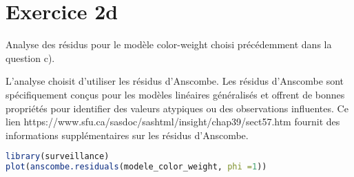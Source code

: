 \documentclass{article}
\begin{document}
\section{Exercice 2d}

 Analyse des résidus pour le modèle color-weight choisi précédemment dans la question c).

  L'analyse choisit d'utiliser les résidus d'Anscombe. Les résidus d'Anscombe sont spécifiquement conçus pour les modèles linéaires généralisés et offrent de bonnes propriétés pour identifier des valeurs atypiques ou des observations influentes. Ce lien https://www.sfu.ca/sasdoc/sashtml/insight/chap39/sect57.htm fournit des informations supplémentaires sur les résidus d'Anscombe.

  \begin {lstlisting}[language=R]
  library(surveillance)
plot(anscombe.residuals(modele_color_weight, phi =1))
  \end{lstlisting}
\end{document}
